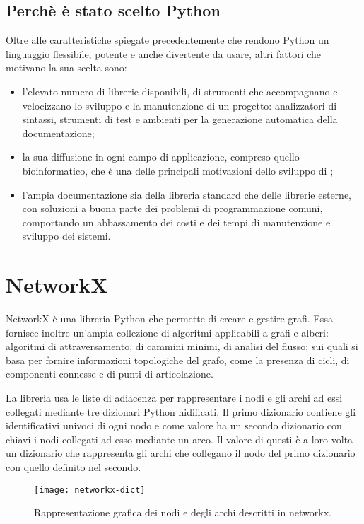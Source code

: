 \subsection{Perchè è stato scelto Python}
Oltre alle caratteristiche spiegate precedentemente che rendono Python
un linguaggio flessibile, potente e anche divertente da usare, altri fattori
che motivano la sua scelta sono:
\begin{itemize}
	\item l'elevato numero di librerie disponibili, di strumenti che accompagnano
		e velocizzano lo sviluppo e la manutenzione di un progetto:
		analizzatori di sintassi, strumenti di test e ambienti per la
		generazione automatica della documentazione;
	\item la sua diffusione in ogni campo di applicazione, compreso
		quello bioinformatico, che è una delle principali motivazioni dello sviluppo
		di \pygfa;
	\item l'ampia documentazione sia della libreria standard che delle librerie esterne,
		con soluzioni a buona parte dei problemi di programmazione comuni,
		comportando un abbassamento dei costi e dei tempi di manutenzione e
		sviluppo dei sistemi.
\end{itemize}

\section{NetworkX}
NetworkX è una libreria Python che permette di creare e gestire grafi.
Essa fornisce inoltre un'ampia collezione di algoritmi applicabili a grafi e
alberi: algoritmi di attraversamento, di cammini minimi, di analisi del
flusso; sui quali si basa per fornire informazioni topologiche
del grafo, come la presenza di cicli, di componenti connesse e di
punti di articolazione.

La libreria usa le liste di adiacenza per rappresentare i nodi e gli archi ad essi
collegati mediante tre dizionari Python nidificati.
Il primo dizionario contiene gli identificativi univoci di ogni nodo e come valore
ha un secondo dizionario con chiavi i nodi collegati ad esso mediante un
arco. Il valore di questi è a loro volta un dizionario che rappresenta
gli archi che collegano il nodo del primo dizionario con quello definito nel secondo.

\begin{wrapfigure} {O} {0.35\textwidth}
	\begin{centering}	
		\texttt{[image: networkx-dict]}
		\caption[Rappresentazione nodi e archi networkx]{Rappresentazione grafica dei nodi e degli archi descritti in networkx.}
		\label{fig:networkx-dict}
	\end{centering}
\end{wrapfigure}

